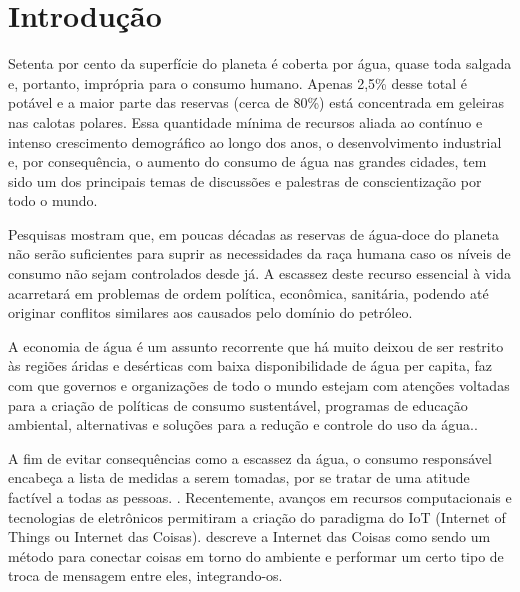 \chapter[Introdução]{Introdução}

Setenta por cento da superfície do planeta é coberta por água, quase toda salgada e, portanto, imprópria para o consumo humano. Apenas 2,5\% desse total é potável e a maior parte das reservas (cerca de 80\%) está concentrada em geleiras nas calotas polares. 
Essa quantidade mínima de recursos aliada ao contínuo e intenso crescimento demográfico ao longo dos anos, o desenvolvimento industrial e, por consequência, o aumento do consumo de água nas grandes cidades, tem sido um dos principais temas de discussões e palestras de conscientização por todo o mundo.\cite{aguaconsumo}

Pesquisas mostram que, em poucas décadas as reservas de água-doce do planeta não serão suficientes para suprir as necessidades da raça humana caso os níveis de consumo não sejam controlados desde já. A escassez deste recurso essencial à vida acarretará em problemas de ordem política, econômica, sanitária, podendo até originar conflitos similares aos causados pelo domínio do petróleo. \cite{Diarias2007}

A economia de água é um assunto recorrente que há muito deixou de ser restrito às regiões áridas e desérticas com baixa disponibilidade de água per capita, faz com que governos e organizações de todo o mundo estejam com atenções voltadas para a criação de políticas de consumo sustentável, programas de educação ambiental, alternativas e soluções para a redução e controle do uso da água.\cite{ferreirasistema}.

A fim de evitar consequências como a escassez da água, o consumo
responsável encabeça a lista de medidas a serem tomadas, por se tratar de uma atitude factível a todas as pessoas. \cite{Diarias2007}. Recentemente, avanços em recursos computacionais e tecnologias de eletrônicos permitiram a criação do paradigma do IoT (Internet of Things ou Internet das Coisas). \cite{Perumal2016} descreve a Internet das Coisas como sendo um método para conectar coisas em torno do ambiente e performar um certo tipo de troca de mensagem entre eles, integrando-os.

